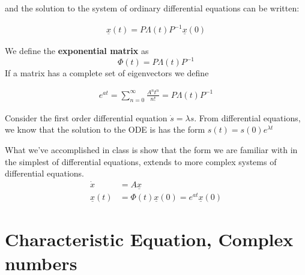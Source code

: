 and the solution to the system of ordinary differential equations can be written: 

\begin{align}
    \underline{x}(t) = P \Lambda (t) P^{-1}\underline{x}(0)
\end{align}

We define the \textbf{exponential matrix} as $$ \Phi (t)= P \Lambda (t) P^{-1} $$ If a matrix has a complete set of eigenvectors we define 

\begin{align}
    e^{at} = \sum_{n=0}^{\infty} \frac{ A^n t^n}{n!} = P \Lambda (t) P^{-1} 
\end{align} 

\begin{example} Consider the first order differential equation $ \dot s = \lambda s$. From differential equations, we know that the solution to the ODE is has the form $ s(t) =s(0)e^{\lambda t}$
\end{example}

What we've accomplished in class is show that the form we are familiar with in the simplest of differential equations, extends to more complex systems of differential equations. 
\begin{align}
\dot x &= A \underline{x} \\
\underline{x}(t) &= \Phi (t) \underline{x}(0) = e^{at}\underline{x}(0)
\end{align} 
















\section{Characteristic Equation, Complex numbers}

